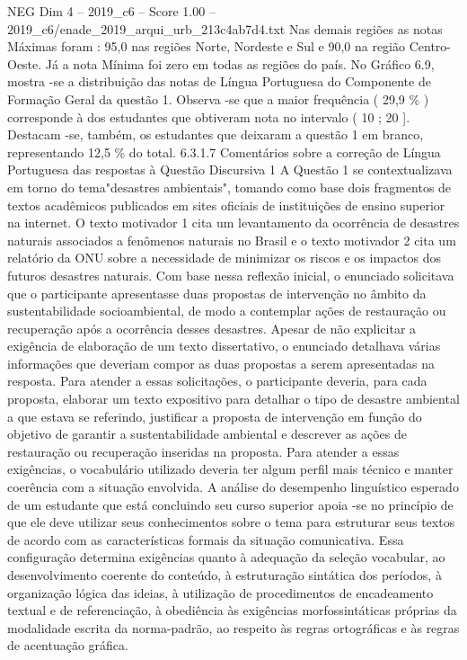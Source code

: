 \begin{textsample}{NEG Dim 4 – 2019\_c6 – Score 1.00 – 2019\_c6/enade\_2019\_arqui\_urb\_213c4ab7d4.txt}
Nas demais regiões as notas Máximas foram : 95,0 nas regiões Norte, Nordeste e Sul e 90,0 na região Centro-Oeste.
Já a nota Mínima foi zero em todas as regiões do país.
No Gráfico 6.9, mostra -se a distribuição das notas de Língua Portuguesa do Componente de Formação Geral da questão 1.
Observa -se que a maior frequência ( 29,9 \% ) corresponde à dos estudantes que obtiveram nota no intervalo ( 10 ; 20 ].
Destacam -se, também, os estudantes que deixaram a questão 1 em branco, representando 12,5 \% do total. 6.3.1.7 Comentários sobre a correção de Língua Portuguesa das respostas à Questão Discursiva 1 A Questão 1 se contextualizava em torno do tema"desastres ambientais", tomando como base dois fragmentos de textos acadêmicos publicados em sites oficiais de instituições de ensino superior na internet.
O texto motivador 1 cita um levantamento da ocorrência de desastres naturais associados a fenômenos naturais no Brasil e o texto motivador 2 cita um relatório da ONU sobre a necessidade de minimizar os riscos e os impactos dos futuros desastres naturais.
Com base nessa reflexão inicial, o enunciado solicitava que o participante apresentasse duas propostas de intervenção no âmbito da sustentabilidade socioambiental, de modo a contemplar ações de restauração ou recuperação após a ocorrência desses desastres.
Apesar de não explicitar a exigência de elaboração de um texto dissertativo, o enunciado detalhava várias informações que deveriam compor as duas propostas a serem apresentadas na resposta.
Para atender a essas solicitações, o participante deveria, para cada proposta, elaborar um texto expositivo para detalhar o tipo de desastre ambiental a que estava se referindo, justificar a proposta de intervenção em função do objetivo de garantir a sustentabilidade ambiental e descrever as ações de restauração ou recuperação inseridas na proposta.
Para atender a essas exigências, o vocabulário utilizado deveria ter algum perfil mais técnico e manter coerência com a situação envolvida.
A análise do desempenho linguístico esperado de um estudante que está concluindo seu curso superior apoia -se no princípio de que ele deve utilizar seus conhecimentos sobre o tema para estruturar seus textos de acordo com as características formais da situação comunicativa.
Essa configuração determina exigências quanto à adequação da seleção vocabular, ao desenvolvimento coerente do conteúdo, à estruturação sintática dos períodos, à organização lógica das ideias, à utilização de procedimentos de encadeamento textual e de referenciação, à obediência às exigências morfossintáticas próprias da modalidade escrita da norma-padrão, ao respeito às regras ortográficas e às regras de acentuação gráfica.

\end{textsample}
